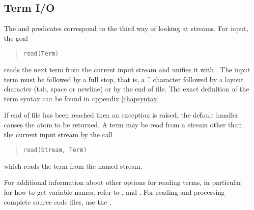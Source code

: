 \subsection{Term I/O}
The %
and
%
predicates  correspond to
the third way of looking at streams.
For input, the goal
\begin{quote}
\begin{verbatim}
read(Term)
\end{verbatim}
\end{quote}
 reads the next {\eclipse} term from the
current input
stream and unifies it with . The input term must be followed by a
full stop, that is, a '.' character followed by a layout
character (tab, space or newline) or by the end of file.
The exact definition of the term syntax can be found in appendix
\ref{chapsyntax}.

If end of file has been reached then
an exception is raised, the default handler causes the atom
 to be returned.
A term may be read from a stream other than the current input stream by
the call
\begin{quote}
\begin{verbatim}
read(Stream, Term)
\end{verbatim}
\end{quote}
which reads the term from the named stream.

For additional information about other options for reading terms,
in particular for how to get variable names, refer to
,
 and
.
For reading and processing complete {\eclipse} source code files, use the
.



